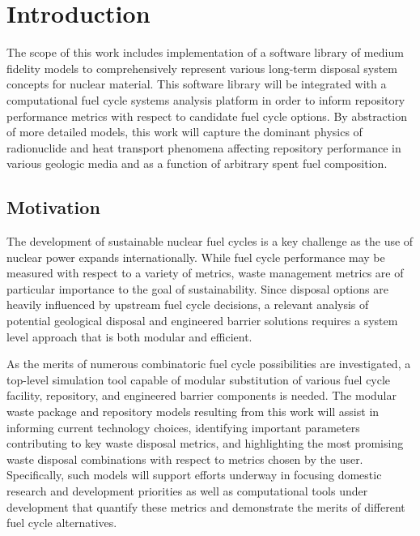 \chapter{Introduction}\label{ch:introduction}


The scope of this work includes implementation of a software library of medium 
fidelity models to comprehensively represent various long-term disposal system 
concepts for nuclear material. This software library will be integrated with a 
computational fuel cycle systems analysis platform in order to inform repository 
performance metrics with respect to candidate fuel cycle options. By abstraction 
of more detailed models, this work will capture the dominant physics of 
radionuclide and heat transport phenomena affecting repository performance in 
various geologic media and as a function of arbitrary spent fuel composition. 

\section{Motivation} 


The development of sustainable nuclear fuel cycles is a key challenge as the use 
of nuclear power expands internationally. While fuel cycle performance may be 
measured with respect to a variety of metrics, waste management metrics are of 
particular importance to the goal of sustainability. Since disposal options are 
heavily influenced by upstream fuel cycle decisions, a relevant analysis of 
potential geological disposal and engineered barrier solutions 
requires a system level approach that is both modular and efficient. 


As the merits of numerous combinatoric fuel cycle possibilities are 
investigated, a top-level simulation tool capable of modular substitution of 
various fuel cycle facility, repository, and engineered barrier components is 
needed. The modular waste package and repository models resulting from this work 
will assist in informing current technology choices, identifying important 
parameters contributing to key waste disposal metrics, and highlighting the most 
promising waste disposal combinations with respect to metrics chosen by
the user. Specifically, such models will support efforts underway in focusing 
domestic research and development priorities as well as computational tools 
under development that quantify these metrics and demonstrate the merits of 
different fuel cycle alternatives. 

